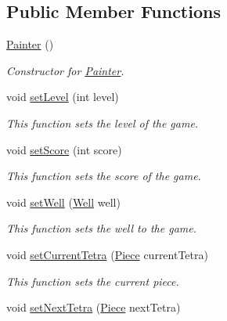 \subsection*{Public Member Functions}
\begin{DoxyCompactItemize}
\item 
\hyperlink{class_project_tetris_1_1_group11_1_1_view_1_1_painter_a0a0ad457a5bce0f4292bedd3cefd5201}{Painter} ()
\begin{DoxyCompactList}\small\item\em Constructor for \hyperlink{class_project_tetris_1_1_group11_1_1_view_1_1_painter}{Painter}. \end{DoxyCompactList}\item 
void \hyperlink{class_project_tetris_1_1_group11_1_1_view_1_1_painter_a5df3fdff19e1680167dda4e72f305b93}{set\+Level} (int level)
\begin{DoxyCompactList}\small\item\em This function sets the level of the game. \end{DoxyCompactList}\item 
void \hyperlink{class_project_tetris_1_1_group11_1_1_view_1_1_painter_a53ff8c3c011fba85c87336a10ca9fd47}{set\+Score} (int score)
\begin{DoxyCompactList}\small\item\em This function sets the score of the game. \end{DoxyCompactList}\item 
void \hyperlink{class_project_tetris_1_1_group11_1_1_view_1_1_painter_a9ba776edf8c7be3a910e6b3bace4f1c6}{set\+Well} (\hyperlink{class_project_tetris_1_1_group11_1_1_model_1_1_well}{Well} well)
\begin{DoxyCompactList}\small\item\em This function sets the well to the game. \end{DoxyCompactList}\item 
void \hyperlink{class_project_tetris_1_1_group11_1_1_view_1_1_painter_abf7153f6bf5943456d59db0e677a3920}{set\+Current\+Tetra} (\hyperlink{class_project_tetris_1_1_group11_1_1_model_1_1_piece}{Piece} current\+Tetra)
\begin{DoxyCompactList}\small\item\em This function sets the current piece. \end{DoxyCompactList}\item 
void \hyperlink{class_project_tetris_1_1_group11_1_1_view_1_1_painter_a7094e1d692231ec3e6a3d4d0db2d2860}{set\+Next\+Tetra} (\hyperlink{class_project_tetris_1_1_group11_1_1_model_1_1_piece}{Piece} next\+Tetra)

\end{DoxyCompactItemize}
